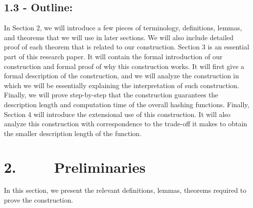 \documentclass[a4paper, english]{paper}
\begin{document}
	\subsection{1.3 - Outline:} 
	In Section 2, we will introduce a few pieces of terminology, definitions, lemmas, and theorems that we will use in later sections. We will also include detailed proof of each theorem that is related to our construction. Section 3 is an essential part of this research paper. It will contain the formal introduction of our construction and formal proof of why this construction works. It will first give a formal description of the construction, and we will analyze the construction in which we will be essentially explaining the interpretation of such construction. Finally, we will prove step-by-step that the construction guarantees the description length and computation time of the overall hashing functions. Finally, Section 4 will introduce the extensional use of this construction. It will also analyze this construction with correspondence to the trade-off it makes to obtain the smaller description length of the function. \\
	
	\section{2. $\qquad$ Preliminaries}
	In this section, we present the relevant definitions, lemmas, theorems required to prove the construction.  \\
	
\end{document}
